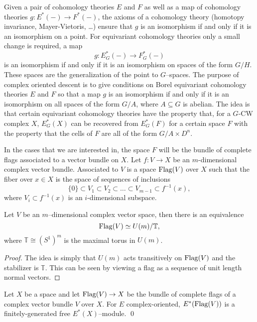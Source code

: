 Given a pair of cohomology theories \(E\) and \(F\) as well as a map of cohomology theories \(g \colon E^*(-) \rightarrow F^*(-)\), the axioms of a cohomology theory (homotopy invariance, Mayer-Vietoris, \ldots) ensure that \(g\) is an isomorphism if and only if it is an isomorphism on a point. For equivariant cohomology theories only a small change is required, a map
\[
g \colon E_{G}^*(-) \rightarrow F_{G}^{*}(-)
\]
is an isomorphism if and only if it is an isomorphism on spaces of the form \(G/H\). These spaces are the generalization of the point to \(G\)--spaces. The purpose of complex oriented descent is to give conditions on Borel equivariant cohomology theories \(E\) and \(F\) so that a map \(g\) is an isomorphism if and only if it is an isomorphism on all spaces of the form \(G/A\), where \(A \subseteq G\) is abelian. The idea is that certain equivariant cohomology theories have the property that, for a \(G\)-CW complex \(X\), \(E_{G}^*(X)\) can be recovered from \(E_{G}^*(F)\) for a certain space \(F\) with the property that the cells of \(F\) are all of the form \(G/A \times D^n\).

In the cases that we are interested in, the space \(F\) will be the bundle of complete flags associated to a vector bundle on \(X\). Let \(f \colon V \rightarrow X\) be an \(m\)-dimensional complex vector bundle. Associated to \(V\) is a space \(\operatorname{Flag}(V)\) over \(X\) such that the fiber over \(x \in X\) is the space of sequences of inclusions
\[
\{0\} \subset V_1 \subset V_2 \subset \ldots \subset V_{m-1} \subset f^{-1}(x),
\]
where \(V_i \subset f^{-1}(x)\) is an \(i\)-dimensional subspace.

\begin{lemma}
Let \(V\) be an \(m\)--dimensional complex vector space, then there is an equivalence
\[
\operatorname{Flag}(V) \simeq U(m)/\mathbb{T},
\]
where \(\mathbb{T} \cong (S^1)^m\) is the maximal torus in \(U(m)\).
\end{lemma}
\begin{proof}
The idea is simply that \(U(m)\) acts transitively on \(\operatorname{Flag}(V)\) and the stabilizer is \(\mathbb{T}\). This can be seen by viewing a flag as a sequence of unit length normal vectors.
\end{proof}


\begin{proposition} \label{finitefreeflags}
Let \(X\) be a space and let \(\operatorname{Flag}(V) \rightarrow X\) be the bundle of complete flags of a complex vector bundle \(V\) over \(X\).  For \(E\) complex-oriented, \(E^*(\operatorname{Flag}(V))\) is a finitely-generated free \(E^*(X)\)--module. \pushQED\qed \qedhere \popQED
\end{proposition}

